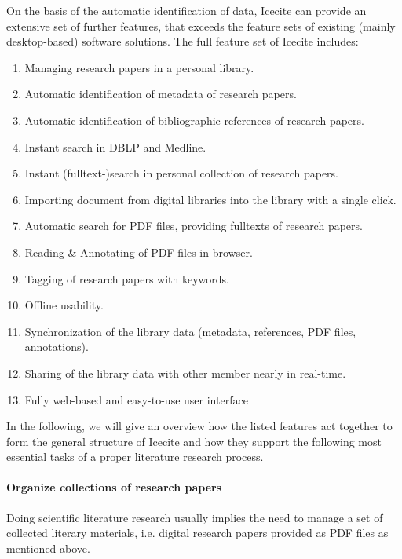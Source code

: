 On the basis of the automatic identification of data, Icecite can provide an extensive set of further features, that exceeds the feature sets of existing (mainly desktop-based) software solutions.  The full feature set of Icecite includes: 
\begin{enumerate}[{(1)}]
 \setlength{\itemsep}{-2pt}
 \item Managing research papers in a personal library.
 \item Automatic identification of metadata of research papers.
 \item Automatic identification of bibliographic references of research papers.
 \item Instant search in DBLP and Medline.  
 \item Instant (fulltext-)search in personal collection of research
 papers.
 \item Importing document from digital libraries into the library with a single click.
 \item Automatic search for PDF files, providing fulltexts of research papers.
 \item Reading \& Annotating of PDF files in browser.
 \item Tagging of  research papers with keywords.
 \item Offline usability.
 \item Synchronization of the library data (metadata, references, PDF files, annotations).
 \item Sharing of the library data with other member nearly in real-time.
 \item Fully web-based and easy-to-use user interface
\end{enumerate}
In the following, we will give an overview how the listed features act together to form the general structure of Icecite and how they support the following most essential tasks of a proper literature research process.

\paragraph{Organize collections of research papers} 
\noindent
Doing scientific literature research usually implies the need to manage a set of collected literary materials, i.e. digital research papers provided as PDF files as mentioned above.


